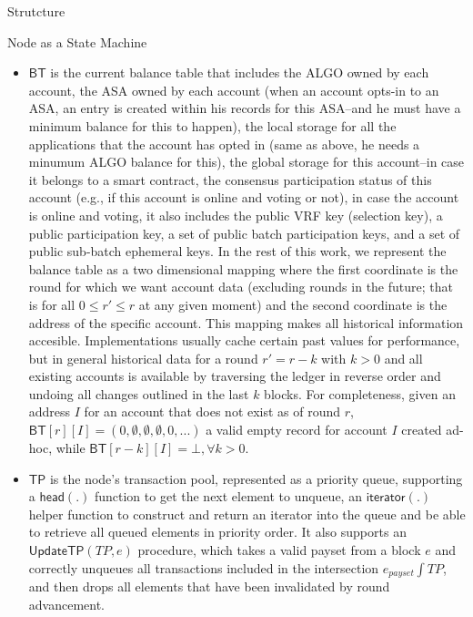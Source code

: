 \documentclass[10pt,a4paper]{article}
\begin{document}
\begin{section}{Strutcture}
\begin{subsection}{Node as a State Machine}
\begin{itemize}
    \item
    $\mathsf{BT}$ is the current balance table  that includes 
      the ALGO owned by each account, 
      the ASA owned by each account (when an account opts-in to an ASA, an entry is created within his records for
        this ASA--and he must have a minimum balance for this to happen),
      the local storage for all the applications that the account has opted in (same as above, he needs a minumum
        ALGO balance for this),
      the global storage for this account--in case it belongs to a smart contract,
      the consensus participation status of this account (e.g., if this account is online and voting or not),
      in case the account is online and voting, it also includes
        the public VRF key (selection key),
        a public participation key, 
        a set of public batch participation keys, 
        and a set of public sub-batch ephemeral keys.
        In the rest of this work, we represent the balance table as a two dimensional mapping where the
        first coordinate is the round for which we want account data (excluding rounds in the future; that
        is for all $0 \leq r\prime \leq r$ at any given moment)
        and the second coordinate is the address of the specific account.
        This mapping makes all historical information accesible. Implementations usually cache certain past
        values for performance, but in general historical data for a round $r\prime = r-k$ with $k>0$ and all 
        existing accounts is available by traversing the ledger in reverse order and undoing all changes outlined 
        in the last $k$ blocks.
        For completeness, given an address $I$ for an account that does not exist as of round $r$,
        $\mathsf{BT}[r][I] = (0,\emptyset,\emptyset,\emptyset,0,...)$ a valid empty record for account $I$ created ad-hoc,
        while $\mathsf{BT}[r-k][I] = \bot, \forall k>0$.

    \item
    $\mathsf{TP}$ is the node's transaction pool, represented as a priority queue, supporting
    a $\mathsf{head(.)}$ function to get the next element to unqueue, an $\mathsf{iterator}(.)$
    helper function to construct and return an iterator into the queue and be able to retrieve all
    queued elements in priority order.
    It also supports an $\mathsf{UpdateTP}(TP,e)$ procedure, which takes a valid payset from a block $e$
    and correctly unqueues all transactions included in the intersection $e_{payset} \int TP$, and then
    drops all elements that have been invalidated by round advancement.


\end{itemize}
\end{subsection}
\end{section}
\end{document}
